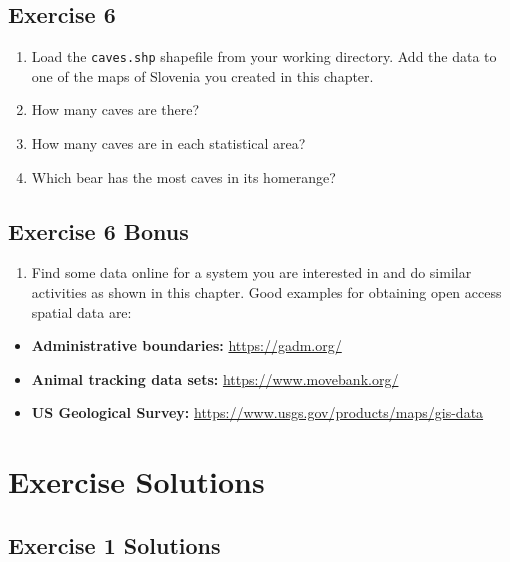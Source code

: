 \documentclass[]{book}
\providecommand{\tightlist}{%
  \setlength{\itemsep}{0pt}\setlength{\parskip}{0pt}}
\begin{document}
\hypertarget{ex6}{%
\section*{Exercise 6}\label{ex6}}

\begin{enumerate}
\def\labelenumi{\arabic{enumi}.}
\tightlist
\item
  Load the \texttt{caves.shp} shapefile \citep{caves-cite} from your working directory. Add the data to one of the maps of Slovenia you created in this chapter.
\item
  How many caves are there?
\item
  How many caves are in each statistical area?
\item
  Which bear has the most caves in its homerange?
\end{enumerate}

\hypertarget{exercise-6-bonus}{%
\section*{Exercise 6 Bonus}\label{exercise-6-bonus}}

\begin{enumerate}
\def\labelenumi{\arabic{enumi}.}
\tightlist
\item
  Find some data online for a system you are interested in and do similar activities as shown in this chapter. Good examples for obtaining open access spatial data are:
\end{enumerate}

\begin{itemize}
\tightlist
\item
  \textbf{Administrative boundaries:} \url{https://gadm.org/}
\item
  \textbf{Animal tracking data sets:} \url{https://www.movebank.org/}
\item
  \textbf{US Geological Survey:} \url{https://www.usgs.gov/products/maps/gis-data}
\end{itemize}

\hypertarget{exercise-solutions}{%
\chapter*{Exercise Solutions}\label{exercise-solutions}}

\hypertarget{ex2-answers}{%
\section*{Exercise 1 Solutions}\label{ex2-answers}}
\end{document}
